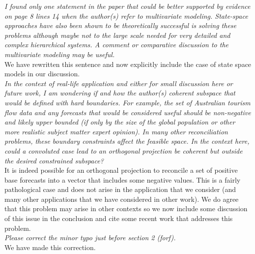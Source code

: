 \documentclass[a4paper,11pt]{article}
\begin{document}
    \noindent\textit{I found only one statement in the paper that could be better supported by evidence on page 8 lines 14 when the author(s) refer to multivariate modeling. State-space approaches have also been shown to be theoretically successful is solving these problems although maybe not to the large scale needed for very detailed and complex hierarchical systems. A comment or comparative discussion to the multivariate modeling may be useful.}\\
    
    \noindent We have rewritten this sentence and now explicitly include the case of state space models in our discussion.\\
    
    
    \noindent\textit{In the context of real-life application and either for small discussion here or future work, I am wondering if and how the author(s) coherent subspace that would be defined with hard boundaries. For example, the set of Australian tourism flow data and any forecasts that would be considered useful should be non-negative and likely upper bounded (if only by the size of the global population or other more realistic subject matter expert opinion). In many other reconciliation problems, these boundary constraints affect the feasible space. In the context here, could a convoluted case lead to an orthogonal projection be coherent but outside the desired constrained subspace?}\\
    
    \noindent It is indeed possible for an orthogonal projection to reconcile a set of positive base forecasts into a vector that includes some negative values.  This is a fairly pathological case and does not arise in the application that we consider (and many other applications that we have considered in other work).  We do agree that this problem may arise in other contexts so we now include some discussion of this issue in the conclusion and cite some recent work that addresses this problem.\\

    \noindent\textit{Please correct the minor typo just before section 2 (forf).}\\
    
    \noindent We have made this correction.\\
    
\end{document}

